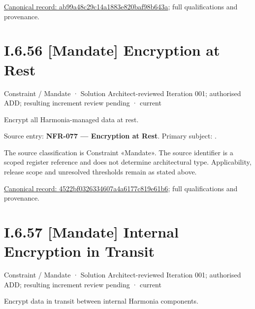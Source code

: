 {\footnotesize \href{../../../../../../../../continuum/motivation/constraint/mandate/ab99a48c29c14a1883e820baf98b643a.md}{Canonical record: ab99a48c29c14a1883e820baf98b643a}; full qualifications and provenance.}\par
\section*{I.6.56 [Mandate] Encryption at Rest}
\label{navigation:I.6.56}

\label{element:4522bf0326334607a4a6177c819e61b6}
{\small Constraint / Mandate · Solution Architect-reviewed Iteration 001; authorised ADD; resulting increment review pending · current}\par

Encrypt all Harmonia-managed data at rest.



Source entry: \textbf{NFR-077 — Encryption at Rest}. Primary subject: \texttt{}.



The source classification is Constraint «Mandate». The source identifier is a scoped register reference and does not determine architectural type. Applicability, release scope and unresolved thresholds remain as stated above.


{\footnotesize \href{../../../../../../../../continuum/motivation/constraint/mandate/4522bf0326334607a4a6177c819e61b6.md}{Canonical record: 4522bf0326334607a4a6177c819e61b6}; full qualifications and provenance.}\par
\section*{I.6.57 [Mandate] Internal Encryption in Transit}
\label{navigation:I.6.57}

\label{element:4b540b55db1b4c1197482d8f29d70e45}
{\small Constraint / Mandate · Solution Architect-reviewed Iteration 001; authorised ADD; resulting increment review pending · current}\par

Encrypt data in transit between internal Harmonia components.



